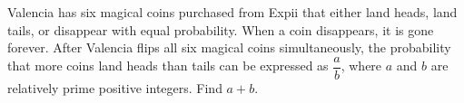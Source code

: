 Valencia has six magical coins purchased from Expii that either land heads, land tails, or disappear with equal probability. When a coin disappears, it is gone forever. After Valencia flips all six magical coins simultaneously, the probability that more coins land heads than tails can be expressed as $\dfrac{a}{b}$, where $a$ and $b$ are relatively prime positive integers. Find $a+b$.
